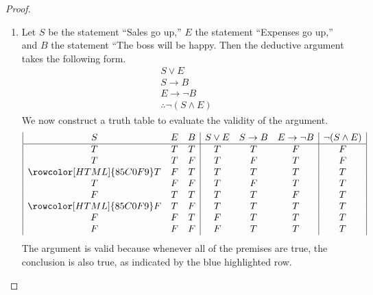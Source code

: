 \documentclass[12pt]{amsart}
\theoremstyle{definition}
\theoremstyle{remark}
\begin{document}
\begin{proof}
\hfill
\begin{enumerate}
	\item Let $S$ be the statement ``Sales go up,'' $E$ the statement ``Expenses go up,'' and $B$ the statement ``The boss will be happy.
	Then the deductive argument takes the following form.
	\begin{equation*}
		\begin{array}{l}
			S \vee E \\
			S \rightarrow B \\
			E \rightarrow \neg B \\
			\hline
			\therefore \neg (S \wedge E)
		\end{array}
	\end{equation*}
	We now construct a truth table to evaluate the validity of the argument.
	\begin{equation*}
		\begin{array}{| c c c | c c c | c |}
			S & E & B & S \vee E & S \rightarrow B & E \rightarrow \neg B & \neg (S \wedge E) \\
			\hline
			T & T & T & T & T & F & F \\
			T & T & F & T & F & T & F \\
			\rowcolor[HTML]{85C0F9} T & F & T & T & T & T & T \\
			T & F & F & T & F & T & T \\
			F & T & T & T & T & F & T \\
			\rowcolor[HTML]{85C0F9} F & T & F & T & T & T & T \\
			F & F & T & F & T & T & T \\
			F & F & F & F & T & T & T
		\end{array}
	\end{equation*}
	The argument is valid because whenever all of the premises are true, the conclusion is also true, as indicated by the blue highlighted row.
	

\end{enumerate}
\end{proof}
\end{document}
